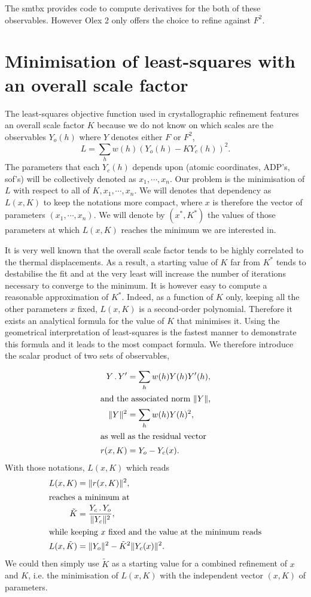 \documentclass{iucr}
\begin{document}
The smtbx provides code to compute derivatives for the both of these observables. However Olex 2 only offers the choice to refine against $F^2$.

\section{Minimisation of least-squares with an overall scale factor}

The least-squares objective function used in crystallographic refinement features an overall scale factor $K$ because we do not know on which scales are the observables $Y_o(h)$ where $Y$ denotes either $F$ or $F^2$,
\begin{equation}
L = \sum_h w(h) (Y_o(h) - K Y_c(h))^2.
\end{equation}
The parameters that each $Y_c(h)$ depends upon (atomic coordinates, ADP's, sof's) will be collectively denoted as $x_1, \cdots, x_n$. Our problem is the minimisation of $L$ with respect to all of $K, x_1, \cdots, x_n$. We will  denotes that dependency as $L(x, K)$ to keep the notations more compact, where $x$ is therefore the vector of parameters $(x_1, \cdots, x_n)$. We will denote by $(x^*, K^*)$ the values of those parameters at which $L(x,K)$ reaches the minimum we are interested in.

It is very well known that the overall scale factor tends to be highly correlated to the thermal displacements. As a result, a starting value of $K$ far from $K^*$ tends to destabilise the fit and at the very least will increase the number of iterations necessary to converge to the minimum. It is however easy to compute a reasonable approximation of $K^*$. Indeed, as a function of $K$ only, keeping all the other parameters $x$ fixed, $L(x, K)$ is a second-order polynomial. Therefore it exists an analytical formula for the value of $K$ that minimises it. Using the geometrical interpretation of least-squares is the fastest manner to demonstrate this formula and it leads to the most compact formula. We therefore introduce the scalar product of two sets of observables,

\begin{align}
Y \operatorname{.} Y' &= \sum_h w(h) Y(h) Y'(h), \\
\intertext{and the associated norm $\| Y \|$,}
\| Y \|^2 &= \sum_h w(h) Y(h)^2, \\
\intertext{as well as the residual vector}
r(x, K) &= Y_o - Y_c(x).
\label{eqn:lsresidualdef}
\end{align}
With those notations, $L(x, K)$ which reads
\begin{align}
L(x, K) &= \| r(x, K) \|^2, \\
\intertext{reaches a minimum at}
\tilde{K} &= \frac{Y_c \operatorname{.} Y_o}{\| Y_c \|^2},
\label{eqn:tildeK}
\\
\intertext{while keeping $x$ fixed and the value at the minimum reads}
L(x, \tilde{K}) &= \| Y_o \|^2 - \tilde{K}^2 \| Y_c(x) \|^2.
\end{align}
We could then simply use $\tilde{K}$ as a starting value for a combined refinement of $x$ and $K$, i.e. the minimisation of $L(x, K)$ with the independent vector $(x, K)$ of parameters.
\end{document}

